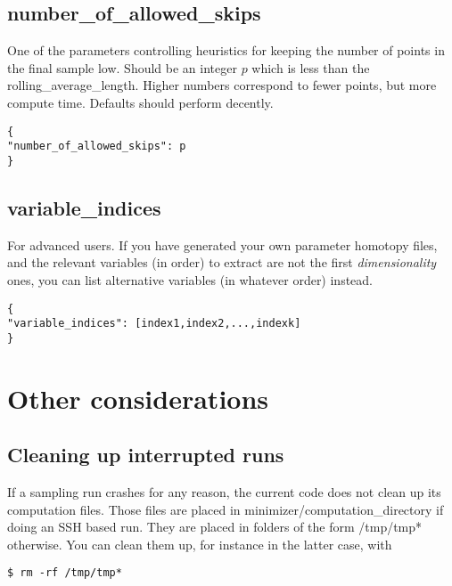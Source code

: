 \documentclass[11pt]{article}
\begin{document}
\subsection{number\_of\_allowed\_skips}
One of the parameters controlling heuristics for keeping the number of points in the final sample low. Should be an integer $p$ which is less than the rolling\_average\_length. Higher numbers correspond to fewer points, but more compute time. Defaults should perform decently.

\begin{verbatim}
{ 
"number_of_allowed_skips": p
}
\end{verbatim} 

\subsection{variable\_indices}
For advanced users. If you have generated your own parameter homotopy files, and the relevant variables (in order) to extract are not the first \emph{dimensionality} ones, you can list alternative variables (in whatever order) instead. 

\begin{verbatim}
{ 
"variable_indices": [index1,index2,...,indexk]
}
\end{verbatim} 

\section{Other considerations} 

\subsection{Cleaning up interrupted runs}
If a sampling run crashes for any reason, the current code does not clean up its computation files. Those files are placed in minimizer/computation\_directory if doing an SSH based run. They are placed in folders of the form /tmp/tmp* otherwise. You can clean them up, for instance in the latter case, with

\begin{verbatim} 
$ rm -rf /tmp/tmp*
\end{verbatim}  
\end{document}
